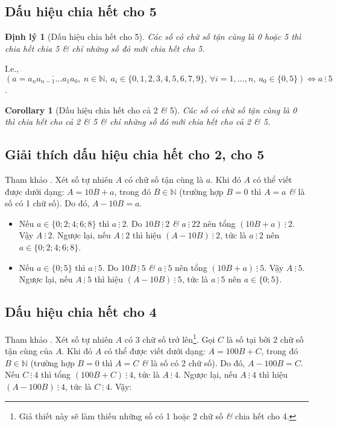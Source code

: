 \documentclass[oneside]{book}
\numberwithin{equation}{section}
\newtheorem{corollary}{Corollary}[section]
\newtheorem{dinhly}{Định lý}[section]
\begin{document}
\subsection{Dấu hiệu chia hết cho 5}
\begin{dinhly}[Dấu hiệu chia hết cho 5]
	Các số có chữ số tận cùng là 0 hoặc 5 thì chia hết chia 5 \textit{\&} chỉ những số đó mới chia hết cho 5.
\end{dinhly}
I.e., $(a = \overline{a_na_{n-1}\ldots a_1a_0},\ n\in\mathbb{N},\ a_i\in\{0,1,2,3,4,5,6,7,9\},\,\forall i = 1,\ldots,n,\ a_0\in\{0,5\})\Leftrightarrow a\ \vdots\ 5$.

\begin{corollary}[Dấu hiệu chia hết cho cả 2 \textit{\&} 5]
	Các số có chữ số tận cùng là 0 thì chia hết cho cả 2 \textit{\&} 5 \textit{\&} chỉ những số đó mới chia hết cho cả 2 \textit{\&} 5.
\end{corollary}

\subsection{Giải thích dấu hiệu chia hết cho 2, cho 5}
Tham khảo \cite[p. 37]{Thai_Anh_Dat_Ha_Loan_Nam_Quang_Toan_6_tap_1}. Xét số tự nhiên $A$ có chữ số tận cùng là $a$. Khi đó $A$ có thể viết được dưới dạng: $A = 10B + a$, trong đó $B\in\mathbb{N}$ (trường hợp $B = 0$ thì $A = a$ \textit{\&} là số có 1 chữ số). Do đó, $A - 10 B = a$.
\begin{itemize}
	\item Nếu $a\in\{0;2;4;6;8\}$ thì $a\ \vdots\ 2$. Do $10B\ \vdots\ 2$ \textit{\&} $a\ \vdots\ 2 2$ nên tổng $(10B + a)\ \vdots\ 2$. Vậy $A\ \vdots\ 2$. Ngược lại, nếu $A\ \vdots\ 2$ thì hiệu $(A - 10B)\ \vdots\ 2$, tức là $a\ \vdots\ 2$ nên $a\in\{0;2;4;6;8\}$.
	\item Nếu $a\in\{0;5\}$ thì $a\ \vdots\ 5$. Do $10B\ \vdots\ 5$ \textit{\&} $a\ \vdots\ 5$ nên tổng $(10B + a)\ \vdots\ 5$. Vậy $A\ \vdots\ 5$. Ngược lại, nếu $A\ \vdots\ 5$ thì hiệu $(A - 10B)\ \vdots\ 5$, tức là $a\ \vdots\ 5$ nên $a\in\{0;5\}$.
\end{itemize}

\subsection{Dấu hiệu chia hết cho 4}
Tham khảo \cite[p. 37]{Thai_Anh_Dat_Ha_Loan_Nam_Quang_Toan_6_tap_1}. Xét số tự nhiên $A$ có 3 chữ số trở lên\footnote{Giả thiết này sẽ làm thiếu những số có 1 hoặc 2 chữ số \textit{\&} chia hết cho 4.}. Gọi $C$ là số tại bởi 2 chữ số tận cùng của $A$. Khi đó $A$ có thể được viết dưới dạng: $A = 100B + C$, trong đó $B\in\mathbb{N}$ (trường hợp $B = 0$ thì $A = C$ \textit{\&} là số có 2 chữ số). Do đó, $A - 100B = C$. Nếu $C\ \vdots\ 4$ thì tổng $(100B + C)\ \vdots\ 4$, tức là $A\ \vdots\ 4$. Ngược lại, nếu $A\ \vdots\ 4$ thì hiệu $(A - 100B)\ \vdots\ 4$, tức là $C\ \vdots\ 4$. Vậy:
\end{document}
